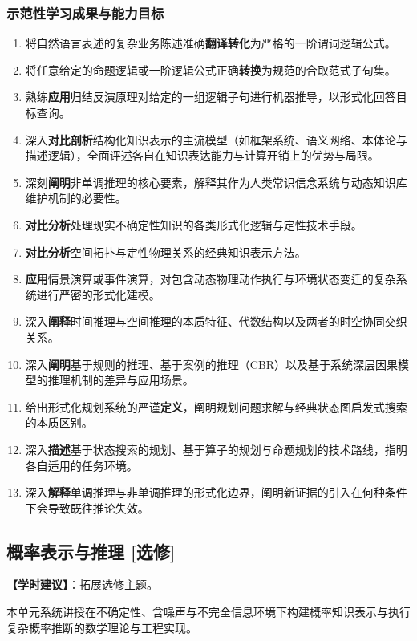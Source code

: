 \subsubsection{示范性学习成果与能力目标}
\begin{enumerate}
    \item 将自然语言表述的复杂业务陈述准确\textbf{翻译转化}为严格的一阶谓词逻辑公式。
    \item 将任意给定的命题逻辑或一阶逻辑公式正确\textbf{转换}为规范的合取范式子句集。
    \item 熟练\textbf{应用}归结反演原理对给定的一组逻辑子句进行机器推导，以形式化回答目标查询。
    \item 深入\textbf{对比剖析}结构化知识表示的主流模型（如框架系统、语义网络、本体论与描述逻辑），全面评述各自在知识表达能力与计算开销上的优势与局限。
    \item 深刻\textbf{阐明}非单调推理的核心要素，解释其作为人类常识信念系统与动态知识库维护机制的必要性。
    \item \textbf{对比分析}处理现实不确定性知识的各类形式化逻辑与定性技术手段。
    \item \textbf{对比分析}空间拓扑与定性物理关系的经典知识表示方法。
    \item \textbf{应用}情景演算或事件演算，对包含动态物理动作执行与环境状态变迁的复杂系统进行严密的形式化建模。
    \item 深入\textbf{阐释}时间推理与空间推理的本质特征、代数结构以及两者的时空协同交织关系。
    \item 深入\textbf{阐明}基于规则的推理、基于案例的推理（CBR）以及基于系统深层因果模型的推理机制的差异与应用场景。
    \item 给出形式化规划系统的严谨\textbf{定义}，阐明规划问题求解与经典状态图启发式搜索的本质区别。
    \item 深入\textbf{描述}基于状态搜索的规划、基于算子的规划与命题规划的技术路线，指明各自适用的任务环境。
    \item 深入\textbf{解释}单调推理与非单调推理的形式化边界，阐明新证据的引入在何种条件下会导致既往推论失效。
\end{enumerate}

\subsection{概率表示与推理 [选修]}
\textbf{【学时建议】}：拓展选修主题。

本单元系统讲授在不确定性、含噪声与不完全信息环境下构建概率知识表示与执行复杂概率推断的数学理论与工程实现。

